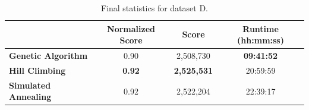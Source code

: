 \bigskip

\begin{table}[h]
\centering\footnotesize\sf
\begin{tabular}{lccc}
\toprule
& Normalized Score & Score & Runtime (hh:mm:ss) \\
\midrule
\textcolor{myblue}{\textbf{Genetic Algorithm}} & 0.90 & 2,508,730 & \textbf{09:41:52} \\
\textcolor{myorange}{\textbf{Hill Climbing}} & \textbf{0.92} & \textbf{2,525,531} & 20:59:59 \\
\textcolor{mygreen}{\textbf{Simulated Annealing}} & 0.92 & 2,522,204 & 22:39:17 \\
\bottomrule
\end{tabular}
\caption[Statistics for dataset D]{
    Final statistics for dataset D.
}
\label{tab:dataset_d_results}
\end{table}






